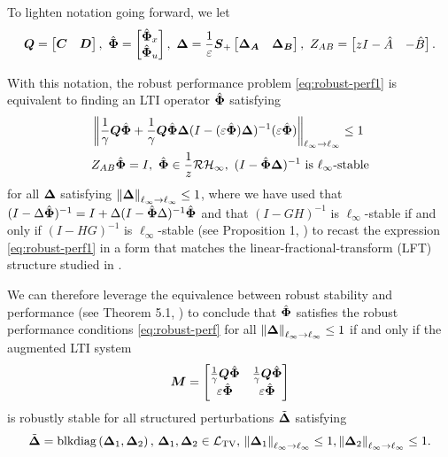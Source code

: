 To lighten notation going forward, we let
\begin{equation}
\tf Q = \begin{bmatrix} \tf C & \tf D \end{bmatrix}, \ \Phih = \begin{bmatrix}\Phixh \\ \Phiuh \end{bmatrix}, \ \D = \frac{1}{\eps}\Sp\begin{bmatrix} \DA & \DB \end{bmatrix}, \ Z_{AB} = \begin{bmatrix} zI-\hat A & - \hat B\end{bmatrix}.
\end{equation}

With this notation, the robust performance problem \eqref{eq:robust-perf1} is equivalent to finding an LTI operator $\hat{\boldsymbol{\Phi}}$ satisfying
\begin{equation} \label{eq:robust-perf}
\begin{aligned}
& \left\|\frac{1}{\gamma}\boldsymbol{Q}\hat{\boldsymbol{\Phi}} + \frac{1}{\gamma}\boldsymbol{Q}\hat{\boldsymbol{\Phi}}{\boldsymbol{\Delta}}(I-(\varepsilon\hat{\boldsymbol{\Phi}}){\boldsymbol{\Delta}})^{-1}(\varepsilon\hat{\boldsymbol{\Phi}})\right\|_{\ell_\infty\to\ell_\infty} \leq 1 \\
& Z_{AB}\hat{\boldsymbol{\Phi}} = I,\ \hat{\boldsymbol{\Phi}} \in \frac{1}{z}\mathcal{RH}_\infty,\   (I-\hat{\boldsymbol{\Phi}}{\boldsymbol{\Delta}})^{-1} \text{ is $\ell_\infty$-stable}\\
\end{aligned}
\end{equation}
for all ${\boldsymbol{\Delta}}$ satisfying $\left\|{\boldsymbol{\Delta}}\right\|_{\ell_\infty\to\ell_\infty}\leq 1$, where we have used that $(I-\Delta\hat{\boldsymbol{\Phi}})^{-1} = I + \Delta(I-\hat{\boldsymbol{\Phi}}\Delta)^{-1}\hat{\boldsymbol{\Phi}}$ and that $(I-GH)^{-1}$ is $\ell_\infty$-stable if and only if $(I-HG)^{-1}$ is $\ell_\infty$-stable (see Proposition 1, \cite{khammash1990stability}) to recast the expression \eqref{eq:robust-perf1} in a form that matches the linear-fractional-transform (LFT) structure studied in \cite{khammash1990stability,dahleh1994control}.

We can therefore leverage the equivalence between robust stability and performance (see Theorem 5.1, \cite{khammash1990stability}) to conclude that $\hat{\boldsymbol{\Phi}}$ satisfies the robust performance conditions \eqref{eq:robust-perf} for all $\left\|{\boldsymbol{\Delta}}\right\|_{\ell_\infty\to\ell_\infty}\leq 1$ if and only if the augmented LTI system
\begin{equation}
\boldsymbol{M} = \begin{bmatrix} \frac{1}{\gamma}\boldsymbol{Q}\hat{\boldsymbol{\Phi}} & \frac{1}{\gamma}\boldsymbol{Q}\hat{\boldsymbol{\Phi}} \\ \varepsilon\hat{\boldsymbol{\Phi}} & \varepsilon\hat{\boldsymbol{\Phi}} \end{bmatrix}
\label{eq:bigM}
\end{equation}
is robustly stable for all structured perturbations $\tilde{{\boldsymbol{\Delta}}}$ satisfying
\begin{equation}
\tilde{{\boldsymbol{\Delta}}} = \mathrm{blkdiag}\left({\boldsymbol{\Delta}}_1,{\boldsymbol{\Delta}}_2\right), \, {\boldsymbol{\Delta}}_1, {\boldsymbol{\Delta}}_2 \in \mathcal{L}_{\mathrm{TV}}, \,  \left\|{\boldsymbol{\Delta}}_1\right\|_{\ell_\infty\to\ell_\infty} \leq 1, \left\|{\boldsymbol{\Delta}}_2\right\|_{\ell_\infty\to\ell_\infty} \leq 1.
\end{equation}

